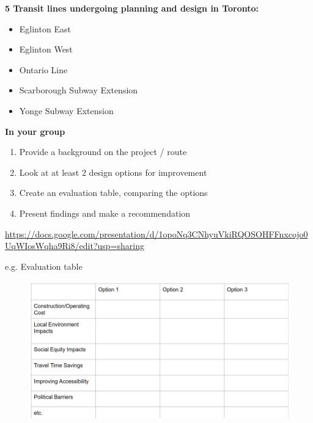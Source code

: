 \documentclass[aspectratio=169]{beamer}
\begin{document}
\begin{frame}
	
	\textbf{5 Transit lines undergoing planning and design in Toronto:}
	
	\begin{itemize}
		\item Eglinton East
		\item Eglinton West
		\item Ontario Line
		\item Scarborough Subway Extension
		\item Yonge Subway Extension
	\end{itemize}
	
	\textbf{In your group}
	
	\begin{enumerate}
		\item Provide a background on the project / route
		\item Look at at least 2 design options for improvement
		\item Create an evaluation table, comparing the options
		\item Present findings and make a recommendation
	\end{enumerate}

	\url{https://docs.google.com/presentation/d/1opoNq3CNhyuVkiRQOSOHFFnxcojo0UqWIosWqha9Ri8/edit?usp=sharing}
	
\end{frame}





\begin{frame}
	
	e.g. Evaluation table
	
	\begin{figure}
		\centering
		\includegraphics[width=1\linewidth]{images/evaluation_table.png}
	\end{figure}	
	
\end{frame}
\end{document}
